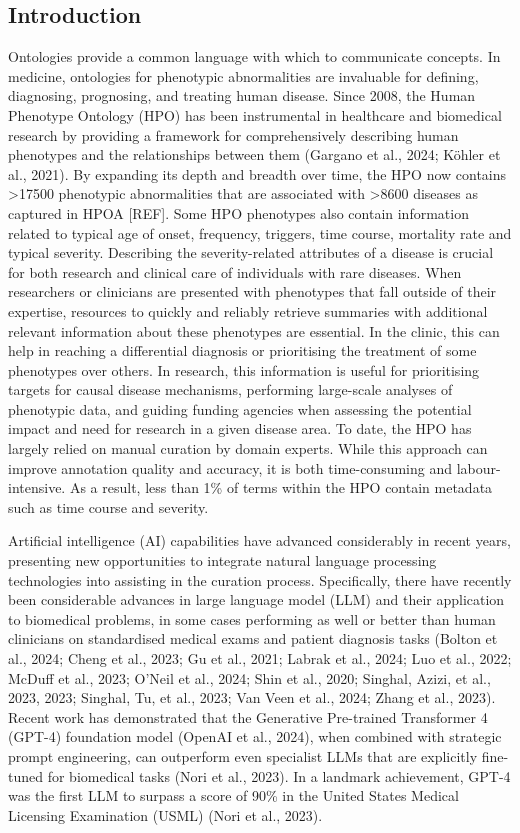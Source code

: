 \documentclass[
]{agujournal2019}
\begin{document}
\subsection{Introduction}\label{introduction}

Ontologies provide a common language with which to communicate concepts.
In medicine, ontologies for phenotypic abnormalities are invaluable for
defining, diagnosing, prognosing, and treating human disease. Since
2008, the Human Phenotype Ontology (HPO) has been instrumental in
healthcare and biomedical research by providing a framework for
comprehensively describing human phenotypes and the relationships
between them (Gargano et al., 2024; Köhler et al., 2021). By expanding
its depth and breadth over time, the HPO now contains \textgreater17500
phenotypic abnormalities that are associated with \textgreater8600
diseases as captured in HPOA {[}REF{]}. Some HPO phenotypes also contain
information related to typical age of onset, frequency, triggers, time
course, mortality rate and typical severity. Describing the
severity-related attributes of a disease is crucial for both research
and clinical care of individuals with rare diseases. When researchers or
clinicians are presented with phenotypes that fall outside of their
expertise, resources to quickly and reliably retrieve summaries with
additional relevant information about these phenotypes are essential. In
the clinic, this can help in reaching a differential diagnosis or
prioritising the treatment of some phenotypes over others. In research,
this information is useful for prioritising targets for causal disease
mechanisms, performing large-scale analyses of phenotypic data, and
guiding funding agencies when assessing the potential impact and need
for research in a given disease area. To date, the HPO has largely
relied on manual curation by domain experts. While this approach can
improve annotation quality and accuracy, it is both time-consuming and
labour-intensive. As a result, less than 1\% of terms within the HPO
contain metadata such as time course and severity.

Artificial intelligence (AI) capabilities have advanced considerably in
recent years, presenting new opportunities to integrate natural language
processing technologies into assisting in the curation process.
Specifically, there have recently been considerable advances in large
language model (LLM) and their application to biomedical problems, in
some cases performing as well or better than human clinicians on
standardised medical exams and patient diagnosis tasks (Bolton et al.,
2024; Cheng et al., 2023; Gu et al., 2021; Labrak et al., 2024; Luo et
al., 2022; McDuff et al., 2023; O'Neil et al., 2024; Shin et al., 2020;
Singhal, Azizi, et al., 2023, 2023; Singhal, Tu, et al., 2023; Van Veen
et al., 2024; Zhang et al., 2023). Recent work has demonstrated that the
Generative Pre-trained Transformer 4 (GPT-4) foundation model (OpenAI et
al., 2024), when combined with strategic prompt engineering, can
outperform even specialist LLMs that are explicitly fine-tuned for
biomedical tasks (Nori et al., 2023). In a landmark achievement, GPT-4
was the first LLM to surpass a score of 90\% in the United States
Medical Licensing Examination (USML) (Nori et al., 2023).
\end{document}
